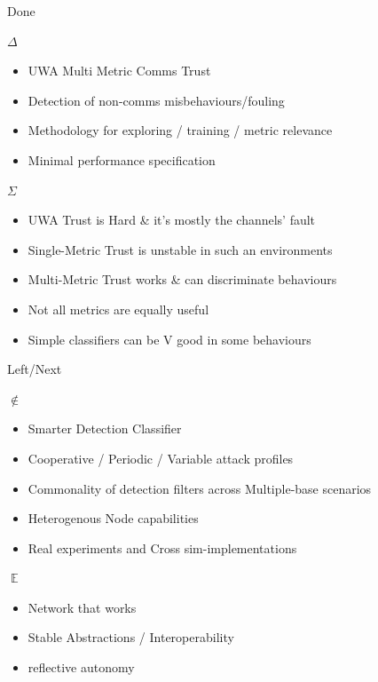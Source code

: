 \documentclass[aspectratio=169]{beamer}
\begin{document}
\begin{frame}{Done}
  
\begin{block}{$\Delta$}
   	\begin{itemize}
   		\item UWA Multi Metric Comms Trust
   		\item Detection of non-comms misbehaviours/fouling 
   		\item Methodology for exploring / training / metric relevance
   		\item Minimal performance specification
   	\end{itemize}
\end{block}

  \begin{block}{$\Sigma$}
    \begin{itemize}
      \item UWA Trust is \alert{Hard} \& it's mostly the channels' fault
      \item Single-Metric Trust is \alert{unstable} in such an environments
      \item Multi-Metric Trust works \& can \alert{discriminate behaviours}
      \item \alert{Not all metrics} are equally useful
      \item Simple classifiers \alert{can} be V good in \alert{some} behaviours
    \end{itemize}
  \end{block}
\end{frame}

\begin{frame}{Left/Next}
  \begin{alertblock}{$\notin$}
    \begin{itemize}
      \item Smarter Detection Classifier
      \item Cooperative / Periodic / Variable attack profiles
      \item Commonality of detection filters across Multiple-base scenarios
      \item Heterogenous Node capabilities\pause
      \item \alert{Real} experiments and Cross sim-implementations
    \end{itemize}
  \end{alertblock}


  \pause
    \begin{exampleblock}{$\mathop{\mathbb{E}}$}
    	\begin{itemize}
    		\item Network that works
    		\item Stable Abstractions / Interoperability
    		\item \alert{reflective autonomy}
    	\end{itemize}
    \end{exampleblock}

\end{frame}
\end{document}
